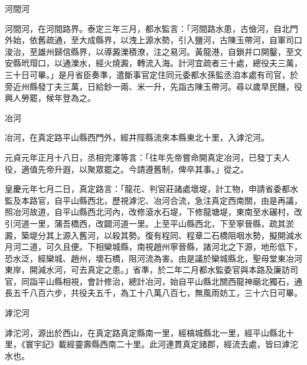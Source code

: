 \begin{pinyinscope}
 河間河



 河間河，在河間路界。泰定三年三月，都水監言：「河間路水患，古儉河，自北門外始，依舊疏通，至大成縣界，以洩上源水勢，引入鹽河，古陳玉帶河，自軍司口浚治，至雄州歸信縣界，以導澱濼積潦，注之易河。黃龍港，自鎖井口開鑿，至文安縣玳瑁口，以通濼水，經火燒澱，轉流入海。計河宜疏者三十處，總役夫三萬，三十日可畢。」是月省臣奏準，遣斷事官定住同元委都水孫監丞洎本處有司官，於旁近州縣發丁夫三萬，日給鈔一兩、米一升，先詣古陳玉帶河。尋以歲旱民饑，役興人勞罷，候年登為之。



 冶河



 冶河，在真定路平山縣西門外，經井陘縣流來本縣東北十里，入滹沱河。



 元貞元年正月十八日，丞相完澤等言：「往年先帝嘗命開真定冶河，已發丁夫人役，適值先帝升遐，以聚眾罷之。今請遵舊制，俾卒其事。」從之。



 皇慶元年七月二日，真定路言：「龍花、判官莊諸處壞堤，計工物，申請省委都水監及本路官，自平山縣西北，歷視滹沱、冶河合流，急注真定西南關，由是再議，照冶河故道，自平山縣西北河內，改修滾水石堤，下修龍塘堤，東南至水碾村，改引河道一里，蒲吾橋西，改闢河道一里。上至平山縣西北，下至寧晉縣，疏其淤澱，築堤分其上源入舊河，以殺其勢。復有程同、程章二石橋阻咽水勢，擬開減水月河二道，可久且便。下相欒城縣，南視趙州寧晉縣，諸河北之下源，地形低下，恐水泛，經欒城、趙州，壞石橋，阻河流為害。由是議於欒城縣北，聖母堂東冶河東岸，開減水河，可去真定之患。」省準，於二年二月都水監委官與本路及廉訪司官，同詣平山縣相視，會計修治，總計冶河，始自平山縣北關西龍神廟北獨石，通長五千八百六步，共役夫五千，為工十八萬八百七，無風雨妨工，三十六日可畢。



 滹沱河



 滹沱河，源出於西山，在真定路真定縣南一里，經槁城縣北一里，經平山縣北十里，《寰宇記》載經靈壽縣西南二十里。此河連貫真定諸郡，經流去處，皆曰滹沱水也。




\end{pinyinscope}
